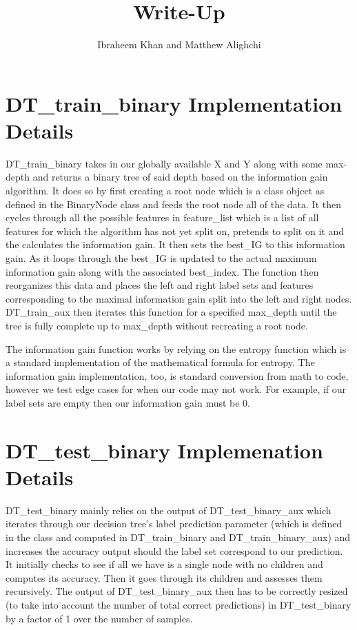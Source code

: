 \documentclass{article}
\begin{document}
    \title{Write-Up}
    \author{Ibraheem Khan and Matthew Alighchi}
    \maketitle
\section{DT\_train\_binary Implementation Details}
    \par DT\_train\_binary takes in our globally available X and Y along with some max-depth and returns a binary tree of said depth based on the information gain algorithm. It does so by first creating a root node
which is a class object as defined in the BinaryNode class and feeds the root node all of the data. It then cycles through all the possible features in feature\_list which is a list of all features for which the
algorithm has not yet split on, pretends to split on it and the calculates the information gain. It then sets the best\_IG to this information gain. As it loops through the best\_IG is updated to the actual
    maximum information gain along with the associated best\_index. The function then reorganizes this data and places the left and right label sets and features corresponding to the maximal information gain
    split into the left and right nodes. DT\_train\_aux then iterates this function for a specified max\_depth until the tree is fully complete up to max\_depth without recreating a root node.
    \par The information gain function works by relying on the entropy function which is a standard implementation of the mathematical formula for entropy. The information gain implementation, too, is standard
conversion from math to code, however we test edge cases for when our code may not work. For example, if our label sets are empty then our information gain must be 0.
\section{DT\_test\_binary Implemenation Details}
    DT\_test\_binary mainly relies on the output of DT\_test\_binary\_aux which iterates through our decision tree's label prediction parameter (which is defined in the class and computed in DT\_train\_binary and DT\_train\_binary\_aux)
    and increases the accuracy output should the label set correspond to our prediction. It initially checks to see if all we have is a single node with no children and computes its accuracy. Then it goes through its
    children and assesses them recursively. The output of DT\_test\_binary\_aux then has to be correctly resized (to take into account the number of total correct predictions) in DT\_test\_binary by a factor of 1 over the number of samples.
\end{document}
